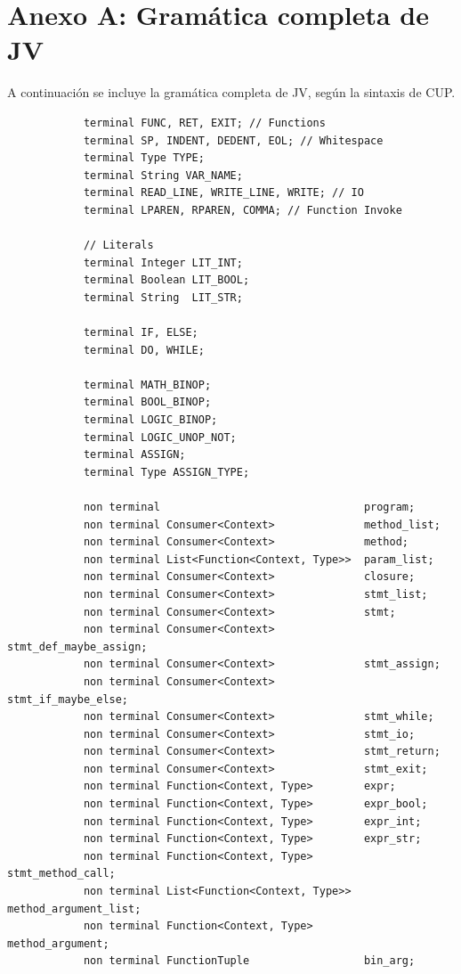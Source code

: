 \documentclass[spanish]{article}
\begin{document}
    \section{Anexo A: Gramática completa de JV}
        \par A continuación se incluye la gramática completa de JV, según la sintaxis de CUP.
        \begin{lstlisting}
            terminal FUNC, RET, EXIT; // Functions
            terminal SP, INDENT, DEDENT, EOL; // Whitespace
            terminal Type TYPE;
            terminal String VAR_NAME;
            terminal READ_LINE, WRITE_LINE, WRITE; // IO
            terminal LPAREN, RPAREN, COMMA; // Function Invoke
            
            // Literals
            terminal Integer LIT_INT;
            terminal Boolean LIT_BOOL;
            terminal String  LIT_STR;
            
            terminal IF, ELSE;
            terminal DO, WHILE;
            
            terminal MATH_BINOP;
            terminal BOOL_BINOP;
            terminal LOGIC_BINOP;
            terminal LOGIC_UNOP_NOT;
            terminal ASSIGN;
            terminal Type ASSIGN_TYPE;
            
            non terminal                                program;
            non terminal Consumer<Context>              method_list;
            non terminal Consumer<Context>              method;
            non terminal List<Function<Context, Type>>  param_list;
            non terminal Consumer<Context>              closure;
            non terminal Consumer<Context>              stmt_list;
            non terminal Consumer<Context>              stmt;
            non terminal Consumer<Context>              stmt_def_maybe_assign;
            non terminal Consumer<Context>              stmt_assign;
            non terminal Consumer<Context>              stmt_if_maybe_else;
            non terminal Consumer<Context>              stmt_while;
            non terminal Consumer<Context>              stmt_io;
            non terminal Consumer<Context>              stmt_return;
            non terminal Consumer<Context>              stmt_exit;
            non terminal Function<Context, Type>        expr;
            non terminal Function<Context, Type>        expr_bool;
            non terminal Function<Context, Type>        expr_int;
            non terminal Function<Context, Type>        expr_str;
            non terminal Function<Context, Type>        stmt_method_call;
            non terminal List<Function<Context, Type>>  method_argument_list;
            non terminal Function<Context, Type>        method_argument;
            non terminal FunctionTuple                  bin_arg;
            

\end{lstlisting}
\end{document}
